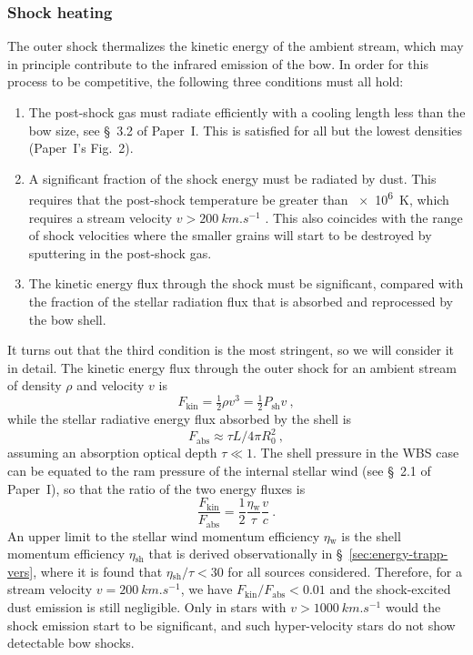 \documentclass[useAMS, usenatbib, a4paper]{mnras}
\newcommand{\wind}{\ensuremath{_{\text{w}}}}
\newcommand{\trap}{\ensuremath{_{\text{abs}}}}
\newcommand{\ke}{\ensuremath{_{\text{kin}}}}
\newcommand\shell{\ensuremath{_{\text{sh}}}}
\begin{document}
\subsubsection{Shock heating}
\newcommand\kin{\ensuremath{_{\text{kin}}}}
The outer shock thermalizes the kinetic energy of the ambient stream,
which may in principle contribute to the infrared emission of the bow.
In order for this process to be competitive, the following three
conditions must all hold:
\begin{enumerate}[1.]
\item The post-shock gas must radiate efficiently with a cooling
  length less than the bow size, see \S~3.2 of Paper~I.\@
  This is satisfied for all but the lowest densities (Paper~I's
  Fig.~2).
\item A significant fraction of the shock energy must be radiated by
  dust.  This requires that the post-shock temperature be greater than
  \SI{e6}{K}, which requires a stream velocity
  \(v > \SI{200}{km.s^{-1}}\) \citep{Draine:1981a}.  This also
  coincides with the range of shock velocities where the smaller
  grains will start to be destroyed by sputtering in the post-shock
  gas.
\item The kinetic energy flux through the shock must be significant,
  compared with the fraction of the stellar radiation flux that is
  absorbed and reprocessed by the bow shell.
\end{enumerate}
It turns out that the third condition is the most stringent, so we
will consider it in detail.  The kinetic energy flux through the outer shock for an ambient stream of density \(\rho\) and velocity \(v\) is
\begin{equation}
  \label{eq:Fkin}
  F\ke = \tfrac12 \rho v^3 = \tfrac12 P\shell v \ , 
\end{equation}
while the stellar radiative energy flux absorbed by the shell is
\begin{equation}
  \label{eq:Ftrap}
  F\trap \approx \tau L / 4 \pi R_0^2 \ ,
\end{equation}
assuming an absorption optical depth \(\tau \ll 1\). The shell
pressure in the WBS case can be equated to the ram pressure of the
internal stellar wind (see
\S~2.1 of Paper~I), so that the ratio of the two energy fluxes is
\begin{equation}
  \label{eq:F-ratio-shock}
  \frac{F\ke}{F\trap} = \frac12 \frac{\eta\wind}{\tau} \frac{v}{c} \ .
\end{equation}
An upper limit to the stellar wind momentum efficiency \(\eta\wind\) is
the shell momentum efficiency \(\eta\shell\) that is derived
observationally in \S~\ref{sec:energy-trapp-vers}, where it is found
that \(\eta\shell / \tau < 30\) for all sources considered.  Therefore, for
a stream velocity \(v = \SI{200}{km.s^{-1}}\), we have
\(F\ke/F\trap < 0.01\) and the shock-excited dust emission is still
negligible.  Only in stars with \(v > \SI{1000}{km.s^{-1}}\) would
the shock emission start to be significant, and such hyper-velocity
stars \citep{Brown:2015a} do not show detectable bow shocks.
\end{document}
